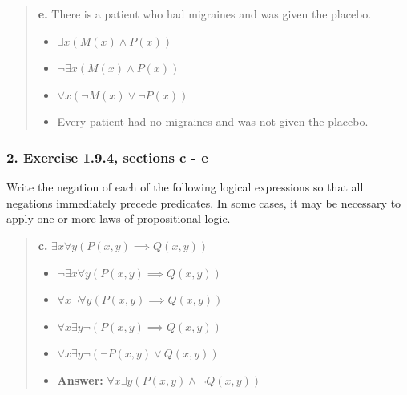 \documentclass[11pt, oneside]{article}
\begin{document}
\begin{quote}
    \textbf{e. }There is a patient who had migraines and was given the placebo.

    \begin{itemize}
        \item[Expression:] $\exists x(M(x) \land P(x))$
        \item[Negation:] $\neg \exists x(M(x) \land P(x))$
        \item[De Morgan:] $\forall x(\neg M(x) \lor \neg P(x))$
        \item[English:] Every patient had no migraines and was not given the placebo.
    \end{itemize}
\end{quote}

\pagebreak

\subsubsection*{2. Exercise 1.9.4, sections c - e}

Write the negation of each of the following logical expressions so that all negations immediately precede predicates. In some cases, it may be necessary to apply one or more laws of propositional logic.

\begin{quote}
    \textbf{c. }$\exists x \forall y (P(x, y) \implies Q(x, y))$

    \begin{itemize}
        \item $\neg \exists x \forall y (P(x, y) \implies Q(x, y))$
        \item $\forall x \neg \forall y (P(x, y) \implies Q(x, y))$
        \item $\forall x \exists y \neg (P(x, y) \implies Q(x, y))$
        \item $\forall x \exists y \neg (\neg P(x, y) \lor Q(x, y))$
        \item \textbf{Answer:} $\forall x \exists y (P(x, y) \land \neg Q(x, y))$
    \end{itemize}
\end{quote}
\end{document}
